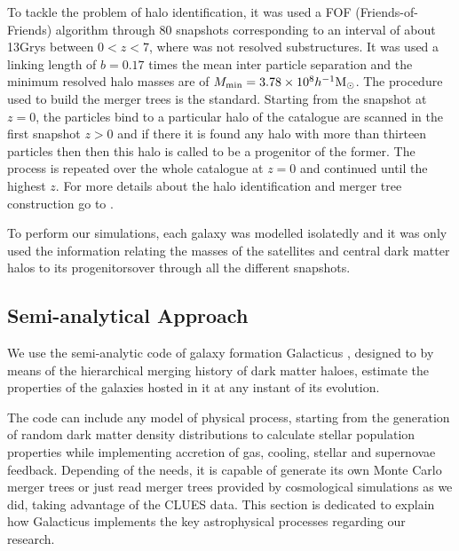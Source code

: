\documentclass[usenatbib]{mn2e}
\newcommand{\hMsun}{{\ifmmode{h^{-1}{\rm {M_{\odot}}}}\else{$h^{-1}{\rm{M_{\odot}}}$}\fi}}
\begin{document}
 To tackle the problem of halo identification, it was used a FOF (Friends-of-Friends) algorithm through 80 snapshots corresponding to an interval of about 13Grys between $0<z<7$,
 where was not resolved substructures. It was used a linking length of $b=0.17$ times the mean inter particle separation and the minimum resolved halo masses are of 
 $M_{\text{min}}=3.78\times 10^8 \hMsun$. The procedure used to build the merger trees is the standard. Starting from the snapshot at $z=0$, the particles bind to a particular 
 halo of the catalogue are scanned in the first snapshot $z>0$  and if there it is found any halo with more than thirteen particles then then this halo is called to be a progenitor 
 of the former. The process is repeated over the whole catalogue at $z=0$ and continued until the highest $z$. For more details about the halo identification and merger tree construction
 go to \cite{2011arXiv1107.0017F}.
 

 To perform our simulations, each galaxy was modelled isolatedly and it was only used the information relating the masses of the satellites and central dark matter halos 
 to its progenitorsover through all the different snapshots.




\subsection{Semi-analytical Approach}
\label{sec:sams}
We use the semi-analytic code of galaxy formation Galacticus \citep{2010arXiv1008.1786B}, designed to  by means of the hierarchical  merging
 history of  dark matter haloes, estimate the properties of the galaxies hosted in it at any instant of its evolution.  

The code can include any model of physical process, starting from the generation of random dark matter density distributions to calculate stellar population 
properties while implementing accretion of gas, cooling, stellar and supernovae feedback. Depending of the needs, it is capable of generate its 
own Monte Carlo merger trees or just read  merger trees provided by cosmological simulations as we did,  taking advantage of the 
CLUES  data. This section is dedicated to explain how Galacticus implements the key astrophysical processes regarding our research.
\end{document}
